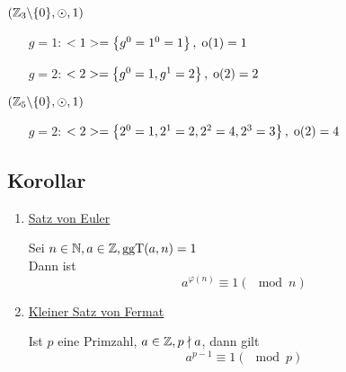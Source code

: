 $(\mathbb{Z}_3 \backslash \{0\}, \odot, 1)$

\begin{itemize}

	\item[$g=1$:]
	$<1> = \left\{g^0 = 1^0 = 1\right\},\; \mathrm{o}(1) = 1$
	
	\item[$g=2$:]
	$<2> = \left\{g^0 = 1, g^1 = 2\right\},\; \mathrm{o}(2)=2$

\end{itemize}

$(\mathbb{Z}_5 \backslash \{0\}, \odot, 1)$

\begin{itemize}
	\item[$g=2$:]
	$<2> = \left\{2^0 = 1, 2^1 = 2, 2^2 = 4, 2^3 = 3\right\}, \; \mathrm{o}(2)=4$
\end{itemize}

\subsection{Korollar}

{\renewcommand{\labelenumi}{(\roman{enumi})}
\begin{enumerate}
	\item
	\underline{Satz von Euler}
	
	Sei $n\in \mathbb{N}, a \in \mathbb{Z}, \mathrm{ ggT }(a, n) = 1$	
	\\Dann ist \[a^{\varphi(n)} \equiv 1 (\mod n)\]
	
	\item
	\underline{Kleiner Satz von Fermat}
	
	Ist $p$ eine Primzahl, $a \in \mathbb{Z}, p \nmid a$, dann gilt
	\[a^{p-1} \equiv 1 (\mod p)\]
	
\end{enumerate}}









